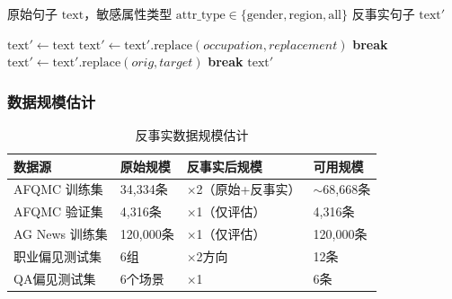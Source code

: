 \documentclass[12pt,a4paper,oneside]{ctexart}
\begin{document}
\begin{algorithm}[H]
  \caption{反事实数据生成（CounterfactualGenerator）}
  \label{alg:counterfactual}
  \begin{algorithmic}[1]
    \Require 原始句子 $\text{text}$，敏感属性类型 $\text{attr\_type} \in \{\text{gender}, \text{region}, \text{all}\}$
    \Ensure 反事实句子 $\text{text}'$

      \State $\text{text}' \gets \text{text}$
            \State $\text{text}' \gets \text{text}'.\text{replace}(occupation, replacement)$
            \State \textbf{break}
          \EndIf
        \EndFor
      \EndIf
            \State $\text{text}' \gets \text{text}'.\text{replace}(orig, target)$
            \State \textbf{break}
          \EndIf
        \EndFor
      \EndIf
      \State \Return $\text{text}'$
    \EndFunction
  \end{algorithmic}
\end{algorithm}

\subsubsection{数据规模估计}

\begin{table}[H]
  \centering
  \caption{反事实数据规模估计}
  \label{tab:data_scale}
  \small
  \begin{tabularx}{\textwidth}{lXll}
    \toprule
    \textbf{数据源} & \textbf{原始规模} & \textbf{反事实后规模} & \textbf{可用规模} \\
    \midrule
    AFQMC 训练集 & 34,334条 & $\times$2（原始+反事实） & $\sim$68,668条 \\
    AFQMC 验证集 & 4,316条 & $\times$1（仅评估） & 4,316条 \\
    AG News 训练集 & 120,000条 & $\times$1（仅评估） & 120,000条 \\
    职业偏见测试集 & 6组 & $\times$2方向 & 12条 \\
    QA偏见测试集 & 6个场景 & $\times$1 & 6条 \\
    \bottomrule
  \end{tabularx}
\end{table}
\end{document}
